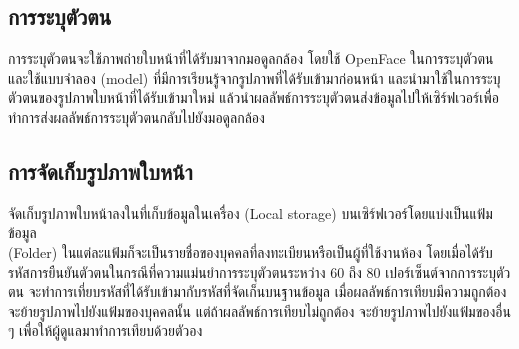 \subsection{การระบุตัวตน}
การระบุตัวตนจะใช้ภาพถ่ายใบหน้าที่ได้รับมาจากมอดูลกล้อง โดยใช้ OpenFace ในการระบุตัวตน และใช้แบบจำลอง (model) ที่มีการเรียนรู้จากรูปภาพที่ได้รับเข้ามาก่อนหน้า 
และนำมาใช้ในการระบุตัวตนของรูปภาพใบหน้าที่ได้รับเข้ามาใหม่ แล้วนำผลลัพธ์การระบุตัวตนส่งข้อมูลไปให้เซิร์ฟเวอร์เพื่อทำการส่งผลลัพธ์การระบุตัวตนกลับไปยังมอดูลกล้อง

\subsection{การจัดเก็บรูปภาพใบหน้า}
จัดเก็บรูปภาพใบหน้าลงในที่เก็บข้อมูลในเครื่อง (Local storage) บนเซิร์ฟเวอร์โดยแบ่งเป็นแฟ้มข้อมูล \\(Folder) 
ในแต่ละแฟ้มก็จะเป็นรายชื่อของบุคคลที่ลงทะเบียนหรือเป็นผู้ที่ใช้งานห้อง 
โดยเมื่อได้รับรหัสการยืนยันตัวตนในกรณีที่ความแม่นยำการระบุตัวตนระหว่าง 60 ถึง 80 เปอร์เซ็นต์จากการระบุตัวตน จะทำการเที่ยบรหัสที่ได้รับเข้ามากับรหัสที่จัดเก็นบนฐานข้อมูล 
เมื่อผลลัพธ์การเทียบมีความถูกต้องจะย้ายรูปภาพไปยังแฟ้มของบุคคลนั้น แต่ถ้าผลลัพธ์การเทียบไม่ถูกต้อง
จะย้ายรูปภาพไปยังแฟ้มของอื่น ๆ เพื่อให้ผู้ดูแลมาทำการเทียบด้วยตัวอง

